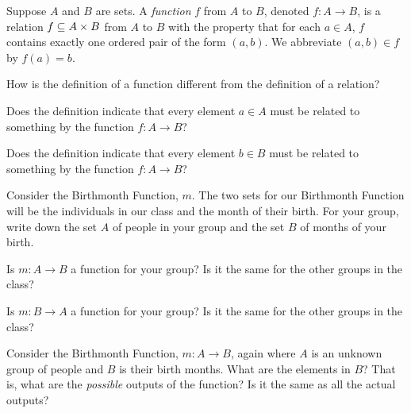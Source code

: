 \begin{definition}[Function]  Suppose $A$ and $B$ are sets.  A \textit{function} $f$ from $A$ to $B$, denoted $f:A \to B$, is a relation $f \subseteq A \times B$ from $A$ to $B$ with the property that for each $a \in A$, $f$ contains exactly one ordered pair of the form $(a,b)$.  We abbreviate $(a,b) \in f$ by $f(a)=b$.
\end{definition}
\begin{question}[resume]
\item How is the definition of a function different from the definition of a relation?

\vspace{2in}

\item Does the definition indicate that every element $a \in A$ must be related to something by the function $f: A \to B$?

\vspace{1.5in}

\item Does the definition indicate that every element $b \in B$ must be related to something by the function $f: A \to B$?

\vspace{1.5in}

\item Consider the Birthmonth Function, $m$.  The two sets for our Birthmonth Function will be the individuals in our class and the month of their birth.  For  your group, write down the set $A$ of people in your group and the set $B$ of months of your birth.

\vspace{2in}

	\begin{qpart}
	\item Is $m: A \to B$ a function for your group?  Is it the same for the other groups in the class?
	
	\vspace{1in}
	
	\item Is $m: B \to A$ a function for your group?  Is it the same for the other groups in the class?
	
	\vspace{1in}
	
	\end{qpart}
	\newpage
\item Consider the Birthmonth Function, $m: A \to B$, again where $A$ is an unknown group of people and $B$ is their birth months.  What are the elements in $B$?  That is, what are the \textit{possible} outputs of the function?  Is it the same as all the actual outputs?


\end{question}
